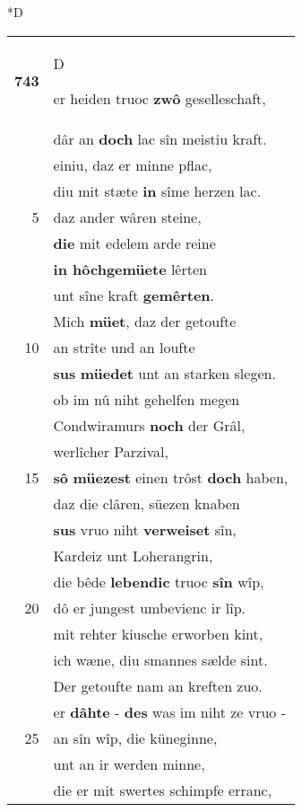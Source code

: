 \documentclass[8pt,a4paper,notitlepage]{article}
\begin{document}
\begin{table}[ht]
\begin{minipage}[t]{0.5\linewidth}
\small
\begin{center}*D
\end{center}
\begin{tabular}{rl}
\textbf{743} & \begin{large}D\end{large}er heiden truoc \textbf{zwô} geselleschaft,\\ 
 & dâr an \textbf{doch} lac sîn meistiu kraft.\\ 
 & einiu, daz er minne pflac,\\ 
 & diu mit stæte \textbf{in} sîme herzen lac.\\ 
5 & daz ander wâren steine,\\ 
 & \textbf{die} mit edelem arde reine\\ 
 & \textbf{in hôchgemüete} lêrten\\ 
 & unt sîne kraft \textbf{gemêrten}.\\ 
 & Mich \textbf{müet}, daz der getoufte\\ 
10 & an strîte und an loufte\\ 
 & \textbf{sus} \textbf{müedet} unt an starken slegen.\\ 
 & ob im nû niht gehelfen megen\\ 
 & Condwiramurs \textbf{noch} der Grâl,\\ 
 & werlîcher Parzival,\\ 
15 & \textbf{sô} \textbf{müezest} einen trôst \textbf{doch} haben,\\ 
 & daz die clâren, süezen knaben\\ 
 & \textbf{sus} vruo niht \textbf{verweiset} sîn,\\ 
 & Kardeiz unt Loherangrin,\\ 
 & die bêde \textbf{lebendic} truoc \textbf{sîn} wîp,\\ 
20 & dô er jungest umbevienc ir lîp.\\ 
 & mit rehter kiusche erworben kint,\\ 
 & ich wæne, diu smannes sælde sint.\\ 
 & Der getoufte nam an kreften zuo.\\ 
 & er \textbf{dâhte} - \textbf{des} was im niht ze vruo -\\ 
25 & an sîn wîp, die küneginne,\\ 
 & unt an ir werden minne,\\ 
 & die er mit swertes schimpfe erranc,\\ 

\end{tabular}
\end{minipage}
\end{table}
\end{document}
